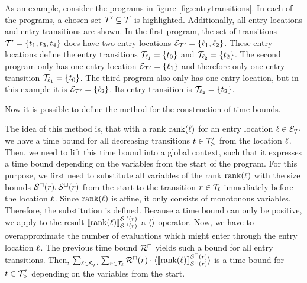 As an example, consider the programs in figure \ref{fig:entrytransitions}.
In each of the programs, a chosen set $\mathcal{T}' \subseteq \mathcal{T}$ is highlighted.
Additionally, all entry locations and entry transitions are shown.
In the first program, the set of transitions $\mathcal{T}' = \lbrace t_1, t_3, t_4 \rbrace$ does have two entry locations $\mathcal{E}_{\mathcal{T}'} = \lbrace \ell_1, \ell_2 \rbrace$.
These entry locations define the entry transitions $\mathcal{T}_{\ell_1} = \lbrace t_0 \rbrace$ and $\mathcal{T}_{\ell_2} = \lbrace t_2 \rbrace$.
The second program only has one entry location $\mathcal{E}_{\mathcal{T}'} = \lbrace \ell_1 \rbrace$ and therefore only one entry transition $\mathcal{T}_{\ell_1} = \lbrace t_0 \rbrace$.
The third program also only has one entry location, but in this example it is $\mathcal{E}_{\mathcal{T}'} = \lbrace \ell_2 \rbrace$.
Its entry transition is $\mathcal{T}_{\ell_2} = \lbrace t_2 \rbrace$.

Now it is possible to define the method for the construction of time bounds.



The idea of this method is, that with a rank $\text{rank}(\ell)$ for an entry location $\ell \in \mathcal{E}_{\mathcal{T}'}$ we have a time bound for all decreasing transitions $t \in \mathcal{T}'_>$ from the location $\ell$.
Then, we need to lift this time bound into a global context, such that it expresses a time bound depending on the variables from the start of the program.
For this purpose, we first need to substitute all variables of the rank $\text{rank}(\ell)$ with the size bounds ${\mathcal{S}^\sqcap}(r), {\mathcal{S}^\sqcup}(r)$ from the start to the transition $r \in \mathcal{T}_{\ell}$ immediately before the location $\ell$.
Since $\text{rank}(\ell)$ is affine, it only consists of monotonous variables.
Therefore, the substitution is defined.
Because a time bound can only be positive, we apply to the result $\llbracket \text{rank}(\ell) \rrbracket_{{\mathcal{S}^\sqcup}(r)}^{{\mathcal{S}^\sqcap}(r)}$ a $\langle\dot\rangle$ operator.
Now, we have to overapproximate the number of evaluations which might enter through the entry location $\ell$.
The previous time bound ${\mathcal{R}^\sqcap}$ yields such a bound for all entry transitions.
Then, $\sum_{\ell \in \mathcal{E}_{\mathcal{T}'}} \sum_{r \in \mathcal{T}_\ell} {\mathcal{R}^\sqcap}(r) \cdot \langle\llbracket \text{rank}(\ell) \rrbracket_{{\mathcal{S}^\sqcup}(r)}^{{\mathcal{S}^\sqcap}(r)}\rangle$ is a time bound for $t \in \mathcal{T}'_>$ depending on the variables from the start.



